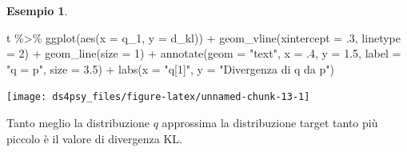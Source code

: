 \documentclass[
  11pt,
]{krantz}
\makeatletter
\newenvironment{Shaded}{\begin{snugshade}}{\end{snugshade}}
\newcommand{\AttributeTok}[1]{\textcolor[rgb]{0.61,0.61,0.61}{#1}}
\newcommand{\DecValTok}[1]{\textcolor[rgb]{0.06,0.06,0.06}{#1}}
\newcommand{\FloatTok}[1]{\textcolor[rgb]{0.06,0.06,0.06}{#1}}
\newcommand{\FunctionTok}[1]{\textcolor[rgb]{0,0,0}{#1}}
\newcommand{\NormalTok}[1]{#1}
\newcommand{\SpecialCharTok}[1]{\textcolor[rgb]{0,0,0}{#1}}
\newcommand{\StringTok}[1]{\textcolor[rgb]{0.5,0.5,0.5}{#1}}
\newenvironment{kframe}{%
\medskip{}
\setlength{\fboxsep}{.8em}
 \def\at@end@of@kframe{}%
 \ifinner\ifhmode%
  \def\at@end@of@kframe{\end{minipage}}%
  \begin{minipage}{\columnwidth}%
 \fi\fi%
 \def\FrameCommand##1{\hskip\@totalleftmargin \hskip-\fboxsep
 \colorbox{shadecolor}{##1}\hskip-\fboxsep
     \hskip-\linewidth \hskip-\@totalleftmargin \hskip\columnwidth}%
 \MakeFramed {\advance\hsize-\width
   \@totalleftmargin\z@ \linewidth\hsize
   \@setminipage}}%
 {\par\unskip\endMakeFramed%
 \at@end@of@kframe}
\renewenvironment{Shaded}{\begin{kframe}}{\end{kframe}}
\theoremstyle{definition}
\theoremstyle{definition}
\newtheorem{example}{Esempio}[chapter]
\theoremstyle{definition}
\theoremstyle{definition}
\theoremstyle{remark}
\makeatother
\begin{document}
\begin{example}
\begin{Shaded}
\begin{Highlighting}[]
\NormalTok{t }\SpecialCharTok{\%\textgreater{}\%}
  \FunctionTok{ggplot}\NormalTok{(}\FunctionTok{aes}\NormalTok{(}\AttributeTok{x =}\NormalTok{ q\_1, }\AttributeTok{y =}\NormalTok{ d\_kl)) }\SpecialCharTok{+}
  \FunctionTok{geom\_vline}\NormalTok{(}\AttributeTok{xintercept =}\NormalTok{ .}\DecValTok{3}\NormalTok{, }\AttributeTok{linetype =} \DecValTok{2}\NormalTok{) }\SpecialCharTok{+}
  \FunctionTok{geom\_line}\NormalTok{(}\AttributeTok{size =} \DecValTok{1}\NormalTok{) }\SpecialCharTok{+}
  \FunctionTok{annotate}\NormalTok{(}\AttributeTok{geom =} \StringTok{"text"}\NormalTok{, }\AttributeTok{x =}\NormalTok{ .}\DecValTok{4}\NormalTok{, }\AttributeTok{y =} \FloatTok{1.5}\NormalTok{, }\AttributeTok{label =} \StringTok{"q = p"}\NormalTok{,}
           \AttributeTok{size =} \FloatTok{3.5}\NormalTok{) }\SpecialCharTok{+}
  \FunctionTok{labs}\NormalTok{(}\AttributeTok{x =} \StringTok{"q[1]"}\NormalTok{,}
       \AttributeTok{y =} \StringTok{"Divergenza di q da p"}\NormalTok{)}
\end{Highlighting}
\end{Shaded}

\begin{center}\texttt{[image: ds4psy\_files/figure-latex/unnamed-chunk-13-1]} \end{center}

Tanto meglio la distribuzione \(q\) approssima la distribuzione target tanto più piccolo è il valore di divergenza KL.
\end{example}
\end{document}
